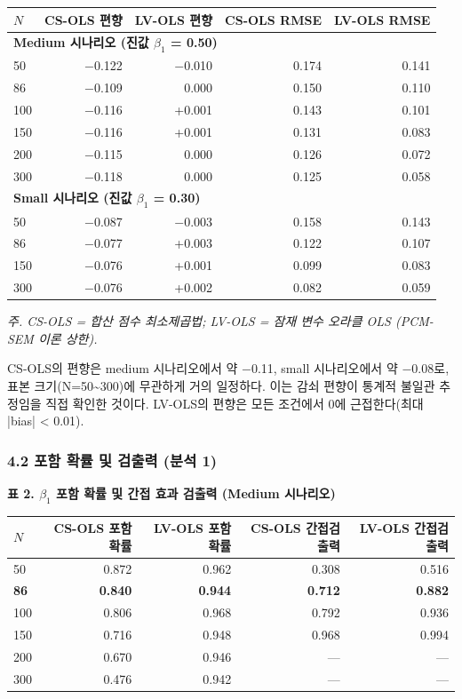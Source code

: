 \documentclass[a4paper,10pt]{oblivoir}
\begin{document}
\begin{table}[htbp]
\centering
\small
\begin{tabular}{lrrrr}
\toprule
$N$ & CS-OLS 편향 & LV-OLS 편향 & CS-OLS RMSE & LV-OLS RMSE \\
\midrule
\multicolumn{5}{l}{\textbf{Medium 시나리오 (진값 $\beta_1$ = 0.50)}} \\
50  & \ensuremath{-}0.122 & \ensuremath{-}0.010 & 0.174 & 0.141 \\
86  & \ensuremath{-}0.109 &  0.000 & 0.150 & 0.110 \\
100 & \ensuremath{-}0.116 & +0.001 & 0.143 & 0.101 \\
150 & \ensuremath{-}0.116 & +0.001 & 0.131 & 0.083 \\
200 & \ensuremath{-}0.115 &  0.000 & 0.126 & 0.072 \\
300 & \ensuremath{-}0.118 &  0.000 & 0.125 & 0.058 \\
\multicolumn{5}{l}{\textbf{Small 시나리오 (진값 $\beta_1$ = 0.30)}} \\
50  & \ensuremath{-}0.087 & \ensuremath{-}0.003 & 0.158 & 0.143 \\
86  & \ensuremath{-}0.077 & +0.003 & 0.122 & 0.107 \\
150 & \ensuremath{-}0.076 & +0.001 & 0.099 & 0.083 \\
300 & \ensuremath{-}0.076 & +0.002 & 0.082 & 0.059 \\
\bottomrule
\end{tabular}
\end{table}

\textit{주. CS-OLS = 합산 점수 최소제곱법; LV-OLS = 잠재 변수 오라클 OLS (PCM-SEM 이론 상한).}

CS-OLS의 편향은 medium 시나리오에서 약 \ensuremath{-}0.11, small 시나리오에서 약 \ensuremath{-}0.08로, 표본 크기(N=50\~{}300)에 무관하게 거의 일정하다. 이는 감쇠 편향이 통계적 불일관 추정임을 직접 확인한 것이다. LV-OLS의 편향은 모든 조건에서 0에 근접한다(최대 |bias| \textless{} 0.01).

\subsubsection{4.2 포함 확률 및 검출력 (분석 1)}

\textbf{표 2. $\beta_1$ 포함 확률 및 간접 효과 검출력 (Medium 시나리오)}

\begin{table}[htbp]
\centering
\small
\begin{tabular}{lrrrr}
\toprule
$N$ & CS-OLS 포함확률 & LV-OLS 포함확률 & CS-OLS 간접검출력 & LV-OLS 간접검출력 \\
\midrule
50  & 0.872 & 0.962 & 0.308 & 0.516 \\
\textbf{86}  & \textbf{0.840} & \textbf{0.944} & \textbf{0.712} & \textbf{0.882} \\
100 & 0.806 & 0.968 & 0.792 & 0.936 \\
150 & 0.716 & 0.948 & 0.968 & 0.994 \\
200 & 0.670 & 0.946 & --- & --- \\
300 & 0.476 & 0.942 & --- & --- \\
\bottomrule
\end{tabular}
\end{table}
\end{document}
